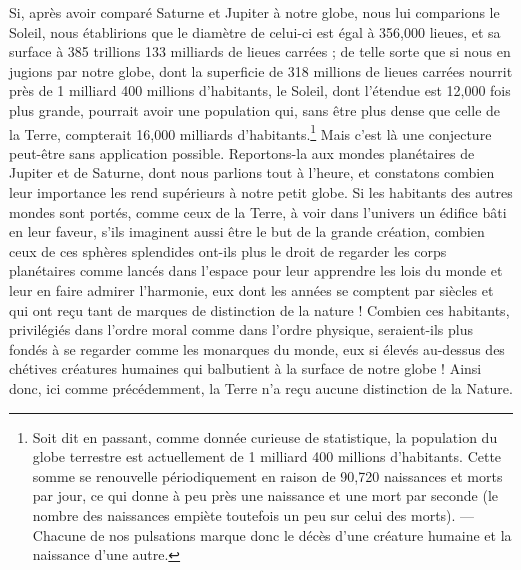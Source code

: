 \documentclass[a4paper, 11pt, oneside, landscape]{article}
\begin{document}
Si, après avoir comparé Saturne et Jupiter à notre globe, nous lui comparions le Soleil, nous établirions que le diamètre de celui-ci est égal à 356,000 lieues, et sa surface à 385 trillions 133 milliards de lieues carrées ; de telle sorte que si nous en jugions par notre globe, dont la superficie de 318 millions de lieues carrées nourrit près de 1 milliard 400 millions d'habitants, le Soleil, dont l'étendue est 12,000 fois plus grande, pourrait avoir une population qui, sans être plus dense que celle de la Terre, compterait 16,000 milliards d'habitants.\footnote{Soit dit en passant, comme donnée curieuse de statistique, la population du globe terrestre est actuellement de 1 milliard 400 millions d'habitants. Cette somme se renouvelle périodiquement en raison de 90,720 naissances et morts par jour, ce qui donne à peu près une naissance et une mort par seconde (le nombre des naissances empiète toutefois un peu sur celui des morts). --- Chacune de nos pulsations marque donc le décès d'une créature humaine et la naissance d'une autre.} Mais c'est là une conjecture peut-être sans application possible. Reportons-la aux mondes planétaires de Jupiter et de Saturne, dont nous parlions tout à l'heure, et constatons combien leur importance les rend supérieurs à notre petit globe. Si les habitants des autres mondes sont portés, comme ceux de la Terre, à voir dans l'univers un édifice bâti en leur faveur, s'ils imaginent aussi être le but de la grande création, combien ceux de ces sphères splendides ont-ils plus le droit de regarder les corps planétaires comme lancés dans l'espace pour leur apprendre les lois du monde et leur en faire admirer l'harmonie, eux dont les années se comptent par siècles et qui ont reçu tant de marques de distinction de la nature ! Combien ces habitants, privilégiés dans l'ordre moral comme dans l'ordre physique, seraient-ils plus fondés à se regarder comme les monarques du monde, eux si élevés au-dessus des chétives créatures humaines qui balbutient à la surface de notre globe ! Ainsi donc, ici comme précédemment, la Terre n'a reçu aucune distinction de la Nature.
\end{document}
